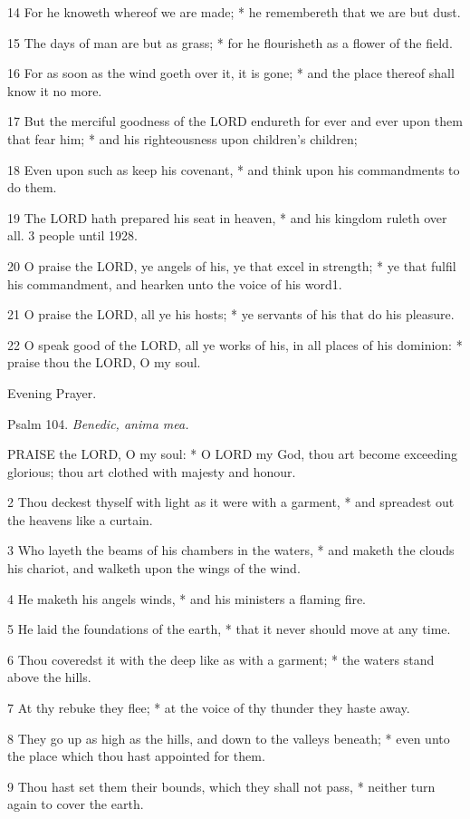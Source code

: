 14 For he knoweth whereof we are made; * he remembereth
that we are but dust.

15 The days of man are but as grass; * for he flourisheth
as a flower of the field.

16 For as soon as the wind goeth over it, it is gone;
* and the place thereof shall know it no more.

17 But the merciful goodness of the LORD endureth for
ever and ever upon them that fear him; * and his righteousness upon children's
children;

18 Even upon such as keep his covenant, * and think
upon his commandments to do them.

19 The LORD hath prepared his seat in heaven, * and
his kingdom ruleth over all. 3 people
until 1928.

20 O praise the LORD, ye angels of his, ye that excel in strength;
* ye that fulfil his commandment, and hearken unto the voice of his word1.

21 O praise the LORD, all ye his hosts; * ye servants
of his that do his pleasure.

22 O speak good of the LORD, all ye works of his, in
all places of his dominion: * praise thou the LORD, O my soul.

Evening
Prayer.

Psalm
104. \emph{Benedic, anima mea.}

PRAISE
the LORD, O my soul: * O LORD my God, thou art become exceeding glorious;
thou art clothed with majesty and honour.

2 Thou deckest thyself with light as it were with a
garment, * and spreadest out the heavens like a curtain.

3 Who layeth the beams of his chambers in the waters,
* and maketh the clouds his chariot, and walketh upon the wings of the
wind.

4 He maketh his angels winds, * and his ministers a
flaming fire.

5 He laid the foundations of the earth, * that it never
should move at any time.

6 Thou coveredst it with the deep like as with a garment;
* the waters stand above the hills.

7 At thy rebuke they flee; * at the voice of thy thunder
they haste away.

8 They go up as high as the hills, and down to the
valleys beneath; * even unto the place which thou hast appointed for them.

9 Thou hast set them their bounds, which they shall
not pass, * neither turn again to cover the earth.

